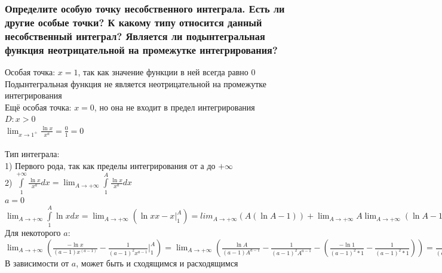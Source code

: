 \documentclass{article}
\begin{document}
\subsubsection{Определите особую точку несобственного интеграла. Есть ли другие особые точки? К какому типу относится данный несобственный интеграл? Является ли подынтегральная функция неотрицательной на промежутке интегрирования?}
Особая точка: $ x = 1 $, так как значение функции в ней всегда равно $ 0 $\\
Подынтегральная функция не является неотрицательной на промежутке интегрирования\\
Ещё особая точка: $ x = 0 $, но она не входит в предел интегрирования\\
$ D: x > 0 $\\
$ \lim_{x\to 1^{+}} \frac{\ln{x}}{x^a} = \frac{0}{1} = 0 $\\\\
Тип интеграла:\\
1) Первого рода, так как пределы интегрирования от $ а $ до $ +\infty $\\
2) $ \int\limits^{+\infty}_{1} \frac{\ln{x}}{x^a}dx = \lim_{A\to +\infty} \int\limits^A_1 \frac{\ln{x}}{x^a}dx $\\
$ a = 0 $\\
$ \lim_{A\to +\infty} \int\limits^A_1 \ln{x}dx = \lim_{A\to +\infty}(\ln{x}x - x |^A_1) = lim_{A\to +\infty} (A (\ln{A} - 1)) + \lim_{A\to +\infty} A \lim_{A\to +\infty} (\ln{A} - 1) + 1 = +\infty $\\
Для некоторого $ a $:\\
$ \lim_{A\to +\infty} (\frac{-\ln{x}}{(a-1)x^{(a-1)}} - \frac{1}{(a-1)^2 x^{a-1}} |^A_1) = \lim_{A\to +\infty} (\frac{\ln{A}}{(a-1)A^{a-1}} - \frac{1}{(a-1)^2 A^{a-1}} - (\frac{-\ln{1}}{(a-1)^2 * 1} - \frac{1}{(a-1)^2 * 1})) = \frac{1}{(a-1)^2} $\\
В зависимости от $ a $, может быть и сходящимся и расходящимся
\end{document}
